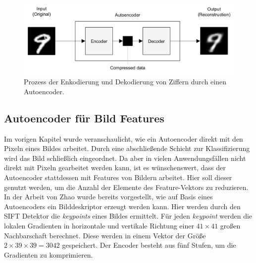 \begin{figure}
	\centering
	\includegraphics[scale=0.55]{images/ae_mnist.png}
	\caption{Prozess der Enkodierung und Dekodierung von Ziffern durch einen Autoencoder.}
	\label{img:ae_mnist}
\end{figure}

\subsection{Autoencoder für Bild Features}

Im vorigen Kapitel wurde veranschaulicht, wie ein Autoencoder direkt mit den Pixeln eines Bildes arbeitet. Durch eine abschließende Schicht zur Klassifizierung wird das Bild schließlich eingeordnet. Da aber in vielen Anwendungsfällen nicht direkt mit Pixeln gearbeitet werden kann, ist es wünschenswert, dass der Autoencoder stattdessen mit Features von Bildern arbeitet.
Hier soll dieser genutzt werden, um die Anzahl der Elemente des Feature-Vektors zu reduzieren. In der Arbeit von Zhao \cite{aed2016} wurde bereits vorgestellt, wie auf Basis eines Autoencoders ein Bilddeskriptor erzeugt werden kann. Hier werden durch den SIFT Detektor die \textit{keypoints} eines Bildes ermittelt. Für jeden \textit{keypoint} werden die lokalen Gradienten in horizontale und vertikale Richtung einer $41 \times 41$ großen Nachbarschaft berechnet. Diese werden in einem Vektor der Größe $2 \times 39 \times 39 = 3042$ gespeichert. Der Encoder besteht aus fünf Stufen, um die Gradienten zu komprimieren.

\todo{}